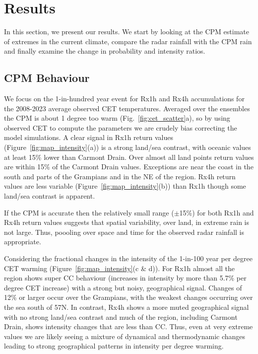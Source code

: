 \documentclass[11pt,a4paper]{article}
\begin{document}
\section{Results}

In this section, we present our results. We start by looking at the CPM estimate of extremes in the current climate, compare the radar rainfall with the CPM rain and finally examine the change in probability and intensity ratios. 
\subsection{CPM Behaviour}
We focus on the 1-in-hundred year event for Rx1h and Rx4h accumulations for the  2008-2023 average observed CET temperatures. Averaged over the  ensembles the CPM is about 1 degree too warm (Fig.~\ref{fig:cet_scatter}a), so by using observed CET to compute the parameters we are crudely bias correcting the model simulations. A clear signal in Rx1h return values (Figure~\ref{fig:map_intensity}(a)) is a strong land/sea contrast, with oceanic values at least 15\% lower than Carmont Drain.  Over almost all  land points return values are within 15\% of the Carmont Drain values. Exceptions are near the coast in the south and parts of the Grampians  and in the NE of the region. Rx4h  return values are less variable (Figure~\ref{fig:map_intensity}(b)) than Rx1h though some land/sea contrast is apparent.  

If the CPM is accurate then the relatively small range ($\pm$15\%) for both Rx1h and Rx4h  return values suggests that spatial variability, over land,  in extreme rain is not large.  Thus, poooling over space and time for the observed radar rainfall is appropriate. 


Considering the fractional changes in the intensity of the 1-in-100 year per degree CET warming (Figure~\ref{fig:map_intensity}(c \& d)). For Rx1h almost all the region shows super CC behaviour (increases in intensity by more than 5.7\% per degree CET increase) with a strong but noisy,  geographical signal.  Changes of 12\% or larger occur over the Grampians, with the weakest changes occurring over the sea south of 57N. In contrast, Rx4h shows a  more muted geographical signal with no strong land/sea contrast and much of the region, including Carmont Drain, shows intensity changes that are less than CC.  Thus, even at very extreme values we are likely seeing a mixture of dynamical and thermodynamic  changes leading to  strong geographical patterns in  intensity per degree warming.
\end{document}
